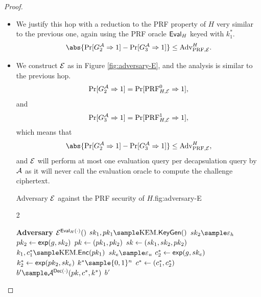 \begin{proof}
\begin{itemize}
    \item[\emph{Claim 3}]
        We justify this hop with a reduction to the PRF property of $H$ very
        similar to the previous one, again using the PRF oracle $\textsf{Eval}_H$
        keyed with $k_1^*$.
        \[
            \abs{\prone{G^{\adversary{A}}_2} - \prone{G^{\adversary{A}}_3}} \leq \advantage{\prf, \adversary{E}}{H}.
        \]
    \item[\emph{Proof}]
        We construct $\mathcal{E}$ as in Figure \ref{fig:adversary-E}, and
        the analysis is similar to the previous hop.
        \[ \Pr[G^{\mathcal{A}}_2 \Rightarrow 1] = \Pr[\text{PRF}^{0}_{H, \mathcal{E}} \Rightarrow 1], \]
        and
        \[ \Pr[G^{\mathcal{A}}_3 \Rightarrow 1] = \Pr[\text{PRF}^1_{H, \mathcal{E}} \Rightarrow 1], \]
        which means that
        \[
            \abs{\prone{G^{\adversary{A}}_2} - \prone{G^{\adversary{A}}_3}} \leq \advantage{\prf, \adversary{E}}{H},
        \]
        and $\mathcal{E}$ will perform at most one evaluation query per
        decapsulation query by $\mathcal{A}$ as it will never call the
        evaluation oracle to compute the challenge ciphertext.
        \begin{gamefigure}{Adversary $\mathcal{E}$ against the PRF security of $H$.}{fig:adversary-E}
            \begin{games}{2}
                \begin{gameenv}{\textbf{Adversary} $\mathcal{E}^{\textsf{Eval}_H(\cdot)}()$}
                    \State $\sk_1, \pk_1 \sample \kem.\keygen()$
                    \State $\sk_2 \sample \honestexponent$
                    \State $pk_2 \leftarrow \textsf{exp}(g, sk_2)$
                    \State $pk \leftarrow (pk_1, pk_2)$
                    \State $sk \leftarrow (sk_1, sk_2, pk_2)$
                    \State $k_1, c^*_1 \sample \kem.\enc(\pk_1)$
                    \State $\sk_e \sample \exponent$
                    \State $c^*_2 \leftarrow \textsf{exp}(g, sk_e)$
                    \State $k^*_2 \leftarrow \textsf{exp}(pk_2, sk_e)$
                    \State $k^* \sample \bits^{n}$ \label{line:e-ug-sampled}
                    \State $c^* \leftarrow (c_1^*, c_2^*)$
                    \State $b' \sample \adversary{A}^{\dec(\cdot)}(\pk, c^*, k^*)$
                    \State \Return $b'$

\end{gameenv}
\end{games}
\end{gamefigure}
\end{itemize}
\end{proof}
